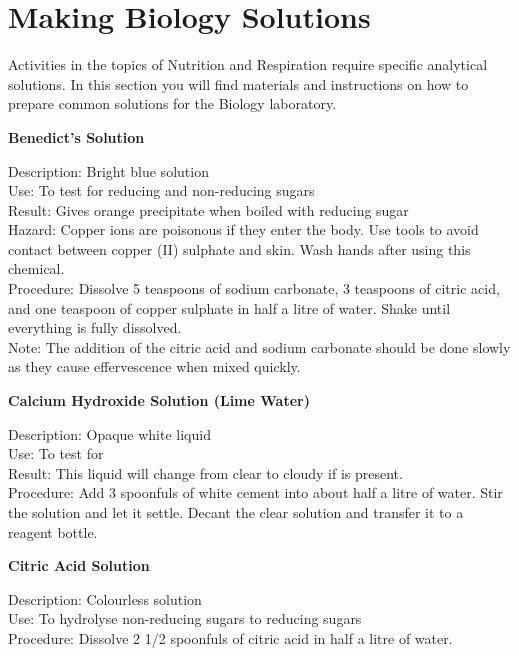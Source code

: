\chapter{Making Biology Solutions}
Activities in the topics of Nutrition and Respiration require specific analytical solutions. In this section you will find materials and instructions on how to prepare common solutions for the Biology laboratory.


\begin{flushleft}
\textbf{Benedict's Solution}
\end{flushleft}
\vspace{-9pt}
Description: Bright blue solution\\
Use: To test for reducing and non-reducing sugars\\
Result: Gives orange precipitate when boiled with reducing sugar\\
Hazard: Copper ions are poisonous if they enter the body. Use tools to avoid contact between copper (II) sulphate and skin. Wash hands after using this chemical.\\
Procedure: Dissolve 5 teaspoons of sodium carbonate, 3 teaspoons of citric acid,
and one teaspoon of copper sulphate in half a litre of water. Shake until everything is fully dissolved.\\Note: The addition of the citric acid and sodium carbonate should be done slowly as they cause effervescence when mixed quickly.\\

\begin{flushleft}
\textbf{Calcium Hydroxide Solution (Lime Water)}
\end{flushleft}
\vspace{-9pt}
Description: Opaque white liquid\\
Use: To test for \\
Result: This liquid will change from clear to cloudy if  is present.\\
Procedure: Add 3 spoonfuls of white cement into about half a litre of water. Stir the solution and let it settle. Decant the clear solution and transfer it to a reagent bottle.\\

\begin{flushleft}
\textbf{Citric Acid Solution}
\end{flushleft}
\vspace{-9pt}
Description: Colourless solution\\
Use: To hydrolyse non-reducing sugars to reducing sugars\\
Procedure: Dissolve 2 1/2 spoonfuls of citric acid in half a litre of water.\\


